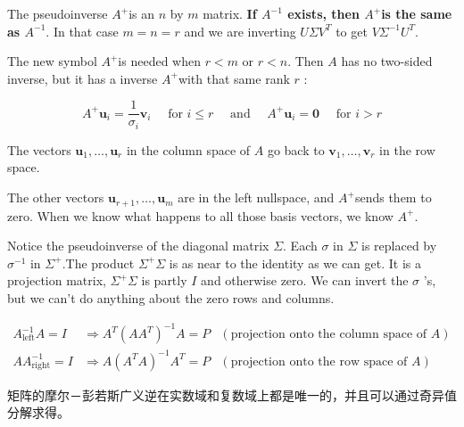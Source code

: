 The pseudoinverse $A^{+}$is an $n$ by $m$ matrix. \textbf{If $A^{-1}$ exists, then $A^{+}$is the same as $A^{-1}$}. In that case $m=n=r$ and we are inverting $U \Sigma V^{ {T}}$ to get $V \Sigma^{-1} U^{ {T}}$. 

The new symbol $A^{+}$is needed when $r<m$ or $r<n$. Then $A$ has no two-sided inverse, but it has a inverse $A^{+}$with that same rank $r$ :

\begin{equation}
A^{+} \boldsymbol{u}_{i}=\frac{1}{\sigma_{i}} \boldsymbol{v}_{i} \quad \text { for } i \leq r \quad \text { and } \quad A^{+} \boldsymbol{u}_{i}=\mathbf{0} \quad \text { for } i>r
\end{equation}

The vectors $\boldsymbol{u}_{1}, \ldots, \boldsymbol{u}_{r}$ in the column space of $A$ go back to $\boldsymbol{v}_{1}, \ldots, \boldsymbol{v}_{r}$ in the row space.


The other vectors $\boldsymbol{u}_{r+1}, \ldots, \boldsymbol{u}_{m}$ are in the left nullspace, and $A^{+}$sends them to zero. When we know what happens to all those basis vectors, we know $A^{+}$.

Notice the pseudoinverse of the diagonal matrix $\Sigma .$ Each $\sigma$ in $\Sigma$ is replaced by $\sigma^{-1}$ in $\Sigma^{+} .$The product $\Sigma^{+} \Sigma$ is as near to the identity as we can get. It is a projection matrix, $\Sigma^{+} \Sigma$ is partly $I$ and otherwise zero. We can invert the $\sigma$ 's, but we can't do anything about the zero rows and columns. 


\begin{theorem}
    \begin{equation}\displaystyle \begin{aligned}
        A_{\text{left}}^{-1} A=I & \Rightarrow A^{T}\left( AA^{T}\right)^{-1} A=P & \left(\text{projection onto the column space of } A\right)\\
        AA_{\text{right}}^{-1} =I & \Rightarrow A\left( A^{T} A\right)^{-1} A^{T} =P & \left(\text{projection onto the row space of } A\right)
        \end{aligned}\end{equation}
\end{theorem}

\begin{remark}
    矩阵的摩尔－彭若斯广义逆在实数域和复数域上都是唯一的，并且可以通过奇异值分解求得。
\end{remark}

